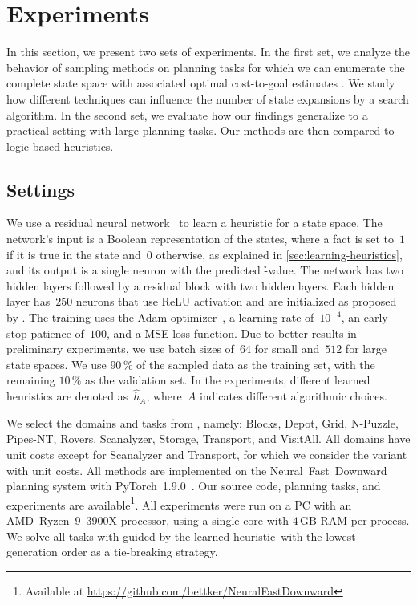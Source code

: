 \chapter{Experiments}
\label{sec:experiments}

In this section, we present two sets of experiments. In the first set, we analyze the behavior of sampling methods on planning tasks for which we can enumerate the complete state space with associated optimal cost-to-goal estimates \hstar. We study how different techniques can influence the number of state expansions by a search algorithm. In the second set, we evaluate how our findings generalize to a practical setting with large planning tasks. Our methods are then compared to logic-based heuristics.

\section{Settings}
\label{sec:settings}

We use a residual neural network~\cite{he2016deep} to learn a heuristic for a state space. The network's input is a Boolean representation of the states, where a fact is set to~$1$ if it is true in the state and~$0$ otherwise, as explained in \cref{sec:learning-heuristics}, and its output is a single neuron with the predicted \h-value. The network has two hidden layers followed by a residual block with two hidden layers. Each hidden layer has~$250$ neurons that use ReLU activation and are initialized as proposed by \citet{he2015delving}. The training uses the Adam optimizer~\cite{kingma2015adam}, a learning rate of~$10^{-4}$, an early-stop patience of~$100$, and a MSE loss function. Due to better results in preliminary experiments, we use batch sizes of~$64$ for small and~$512$ for large state spaces. We use $90\,\%$ of the sampled data as the training set, with the remaining $10\,\%$ as the validation set. In the experiments, different learned heuristics are denoted as~$\hat h_A$, where~$A$ indicates different algorithmic choices.

We select the domains and tasks from \citet{ferber2022neural}, namely: Blocks, Depot, Grid, N-Puzzle, Pipes-NT, Rovers, Scanalyzer, Storage, Transport, and VisitAll. All domains have unit costs except for Scanalyzer and Transport, for which we consider the variant with unit costs. All methods are implemented on the Neural~Fast~Downward planning system with PyTorch~1.9.0~\cite{ferber2020neural,paszke2019pytorch}. Our source code, planning tasks, and experiments are available\footnote{Available at \url{https://github.com/bettker/NeuralFastDownward}}. All experiments were run on a PC with an AMD~Ryzen~9~3900X processor, using a single core with $4$\,GB RAM per process. We solve all tasks with \gbfs guided by the learned heuristic~\hnn with the lowest generation order as a tie-breaking strategy.


